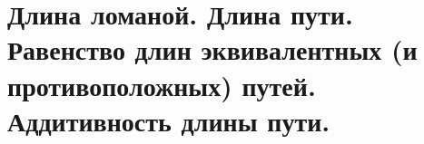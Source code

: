 \documentclass[../main.tex]{subfiles}
\begin{document}
\newpage
\section{Длина ломаной. Длина пути. Равенство длин эквивалентных (и противоположных) путей. Аддитивность длины пути.}
\end{document}
